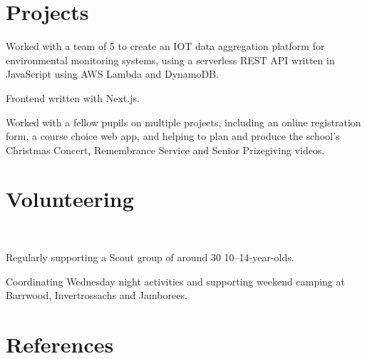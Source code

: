 \documentclass[]{hieudo-build}
\begin{document}
\begin{minipage}[t]{0.62\textwidth}
	\section{Projects}

	\descript{}
	\begin{tightemize}
		\item Worked with a team of 5 to create an IOT data aggregation platform for environmental monitoring systems, using a serverless REST API written in JavaScript using AWS Lambda and DynamoDB.
		\item Frontend written with Next.js.
	\end{tightemize}
	\sectionsep

	\begin{tightemize}
		\item Worked with a fellow pupils on multiple projects, including an online registration form, a course choice web app, and helping to plan and produce the school’s Christmas Concert, Remembrance Service and Senior Prizegiving videos.
	\end{tightemize}
	\sectionsep

\end{minipage}

\newpage

\section{Volunteering}

 \\
\begin{tightemize}
	\item Regularly supporting a Scout group of around 30 10–14-year-olds.
	\item Coordinating Wednesday night activities and supporting weekend camping at Barrwood, Invertrossachs and Jamborees.
\end{tightemize}
\sectionsep

\section{References}
\end{document}

